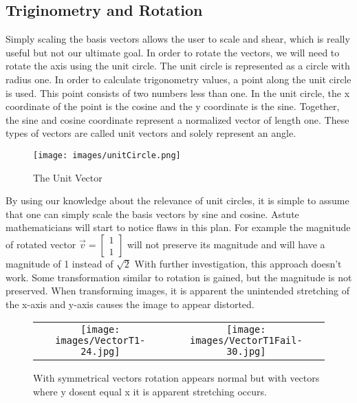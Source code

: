 \subsection{Triginometry and Rotation}
Simply scaling the basis vectors allows the user to scale and shear, which is really useful but not our ultimate goal. In order to rotate the vectors, we will need to rotate the axis using the unit circle. The unit circle is represented as a circle with radius one. In order to calculate trigonometry values, a point along the unit circle is used. This point consists of two numbers less than one. In the unit circle, the x coordinate of the point is the cosine and the y coordinate is the sine. Together, the sine and cosine coordinate represent a normalized vector of length one. These types of vectors are called unit vectors and solely represent an angle.

\begin{figure}[ht]\centering %
	\texttt{[image: images/unitCircle.png]}
	\caption{The Unit Vector}
	\label{fig:unitVec}
\end{figure}

By using our knowledge about the relevance of unit circles, it is simple to assume that one can simply scale the basis vectors by sine and cosine. Astute mathematicians will start to notice flaws in this plan. For example the magnitude of rotated vector $\vec{v}=\begin{bmatrix}1\\1\end{bmatrix}$ will not preserve its magnitude and will have a magnitude of 1 instead of $\sqrt{2}$ With further investigation, this approach doesn't work. Some transformation similar to rotation is gained, but the magnitude is not preserved. When transforming images, it is apparent the unintended stretching of the x-axis and y-axis causes the image to appear distorted. 


\begin{figure}[ht]\centering %
\begin{tabular}{ c c }
	\texttt{[image: images/VectorT1-24.jpg]} & \texttt{[image: images/VectorT1Fail-30.jpg]}
\end{tabular}
	\caption{With symmetrical vectors rotation appears normal but with vectors where y dosent equal x it is apparent stretching occurs.}
	\label{fig:exGifs}
\end{figure}



